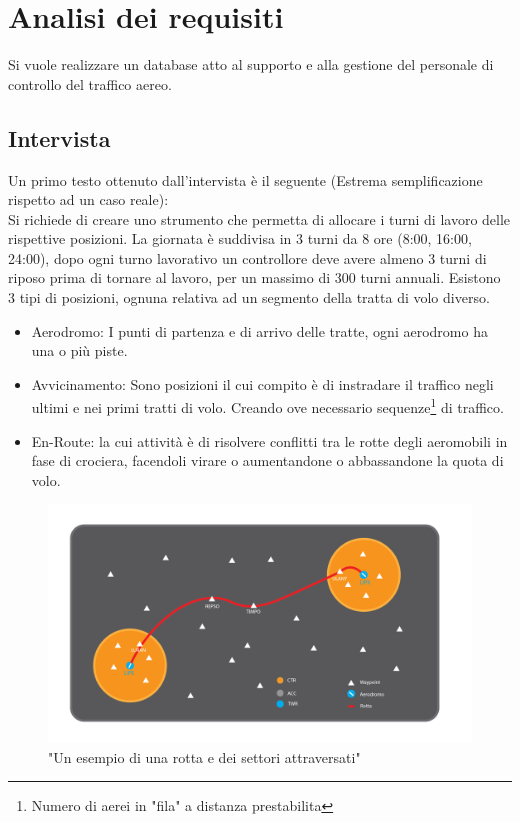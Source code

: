 \chapter{Analisi dei requisiti}
Si vuole realizzare un database atto al supporto e alla gestione del personale di controllo del traffico aereo.
\section{Intervista}
Un primo testo ottenuto dall'intervista è il seguente (Estrema semplificazione rispetto ad un caso reale):\\
Si richiede di creare uno strumento che permetta di allocare i turni di lavoro delle rispettive posizioni. La giornata è suddivisa in 3 turni da 8 ore (8:00, 16:00, 24:00), dopo ogni turno lavorativo un controllore deve avere almeno 3 turni di riposo prima di tornare al lavoro, per un massimo di 300 turni annuali.
Esistono 3 tipi di posizioni, ognuna relativa ad un segmento della tratta di volo diverso. 
\begin{itemize}
    \item Aerodromo:
I punti di partenza e di arrivo delle tratte, ogni aerodromo ha una o più piste. %
\item Avvicinamento:
Sono posizioni il cui compito è di instradare il traffico negli ultimi e nei primi tratti di volo. Creando ove necessario sequenze\footnote{Numero di aerei in "fila" a distanza prestabilita} di traffico.
\item En-Route:
la cui attività è di risolvere conflitti tra le rotte degli aeromobili in fase di crociera, facendoli virare o aumentandone o abbassandone la quota di volo.
\end{itemize}
\begin{figure}[H]
  \centering
  \includegraphics[width=1\textwidth]{figures/Rotta.png}
  \caption{"Un esempio di una rotta e dei settori attraversati"}
  \label{fig:example}
\end{figure}
